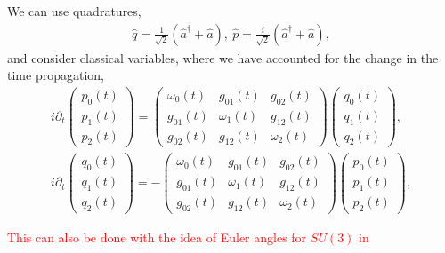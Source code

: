 \documentclass[9pt,twocolumn,twoside]{osajnl}
\begin{document}
We can use quadratures,
\begin{eqnarray}
\hat{q} = \frac{1}{\sqrt{2}} \left( \hat{a}^{\dagger} + \hat{a} \right), ~ 
\hat{p} = \frac{i}{\sqrt{2}} \left( \hat{a}^{\dagger} + \hat{a} \right),
\end{eqnarray}
and consider classical variables, where we have accounted for the change in the time propagation,
\begin{eqnarray}
	i \partial_t	
	\left( \begin{array}{c} 
		p_{0}(t) \\
		p_{1}(t) \\
		p_{2}(t)
	\end{array} \right) =
	\left( \begin{array}{ccc} 
		\omega_{0}(t)  & g_{01}(t) & g_{02}(t) \\
		g_{01}(t) & \omega_{1}(t) & g_{12}(t) \\
		g_{02}(t) & g_{12}(t) & \omega_{2}(t)
	\end{array} \right)
	\left( \begin{array}{c} 
		q_{0}(t) \\
		q_{1}(t) \\
		q_{2}(t)
	\end{array} \right) , \\
i \partial_t	
	\left( \begin{array}{c} 
		q_{0}(t) \\
		q_{1}(t) \\
		q_{2}(t)
	\end{array} \right) = -
	\left( \begin{array}{ccc} 
		\omega_{0}(t)  & g_{01}(t) & g_{02}(t) \\
		g_{01}(t) & \omega_{1}(t) & g_{12}(t) \\
		g_{02}(t) & g_{12}(t) & \omega_{2}(t)
	\end{array} \right)
	\left( \begin{array}{c} 
		p_{0}(t) \\
		p_{1}(t) \\
		p_{2}(t)
	\end{array} \right) ,
\end{eqnarray}



\textcolor{red}{This can also be done with the idea of Euler angles for $SU(3)$ in \cite{Nelson1967p857}}
\end{document}
